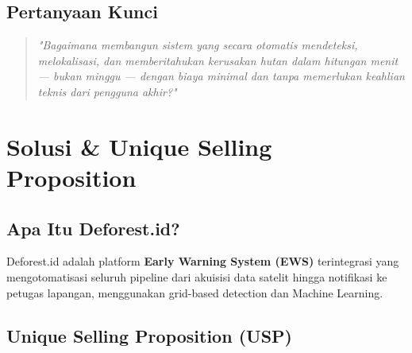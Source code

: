 \documentclass[11pt,a4paper]{article}
\begin{document}
\subsection{Pertanyaan Kunci}

\begin{quotation}
\textit{"Bagaimana membangun sistem yang secara otomatis mendeteksi, melokalisasi, dan memberitahukan kerusakan hutan dalam hitungan menit --- bukan minggu --- dengan biaya minimal dan tanpa memerlukan keahlian teknis dari pengguna akhir?"}
\end{quotation}

\section{Solusi \& Unique Selling Proposition}

\subsection{Apa Itu Deforest.id?}

Deforest.id adalah platform \textbf{Early Warning System (EWS)} terintegrasi yang mengotomatisasi seluruh pipeline dari akuisisi data satelit hingga notifikasi ke petugas lapangan, menggunakan grid-based detection dan Machine Learning.

\subsection{Unique Selling Proposition (USP)}
\end{document}
